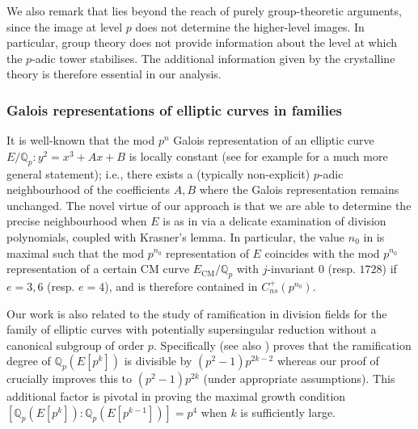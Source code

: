 \documentclass{amsart}
\newcommand{\Qp}{\mathbb{Q}_p}
\theoremstyle{definition}
\newcommand{\Q}{\mathbb{Q}}
\numberwithin{theorem}{section}
\numberwithin{equation}{section}
\begin{document}
We also remark that  lies beyond the reach of purely group-theoretic arguments, since the image at level $p$ does not determine the higher-level images. In particular, group theory does not provide information about the level at which the $p$-adic tower stabilises. The additional information given by the crystalline theory is therefore essential in our analysis.

\subsubsection*{Galois representations of elliptic curves in families}

It is well-known that the mod $p^n$ Galois representation of an elliptic curve $E/\Qp: y^2=x^3+Ax+B$ is locally constant (see for example \cite[Theorem~5.1(1)]{Kisin} for a much more general statement); i.e., there exists a (typically non-explicit) $p$-adic neighbourhood of the coefficients $A, B$ where the Galois representation remains unchanged. The novel virtue of our approach is that we are able to determine the precise neighbourhood when $E$ is as in  via a delicate examination of division polynomials, coupled with Krasner's lemma. In particular, the value $n_0$ in  is maximal such that the mod $p^{n_0}$ representation of $E$ coincides with the mod $p^{n_0}$ representation of a certain CM curve $E_{\textrm{CM}}/\Qp$ with $j$-invariant $0$ (resp. $1728$) if $e=3,6$ (resp. $e=4$), and is therefore contained in $C_{ns}^+(p^{n_0})$. 

Our work is also related to the study of ramification in division fields for the family of elliptic curves with potentially supersingular reduction without a canonical subgroup of order $p$. Specifically \cite[Theorem 1.1]{smith23} (see also \cite{MR3501021}) proves that the ramification degree of $\Q_p(E[p^k])$ is divisible by $(p^2-1)p^{2k-2}$ whereas our proof of  crucially improves this to $(p^2-1)p^{2k}$ (under appropriate assumptions). This additional factor is pivotal in proving the maximal growth condition $[\Q_p(E[p^{k}]) : \Q_p(E[p^{k-1}])] = p^4$ when $k$ is sufficiently large.
\end{document}

